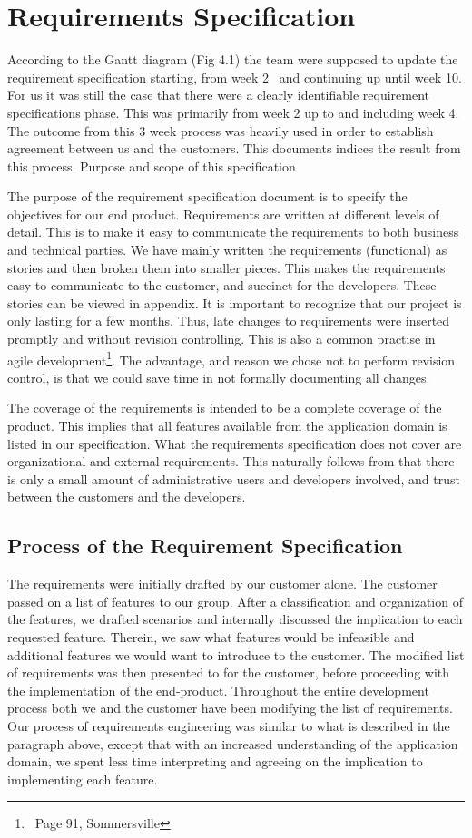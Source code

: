 \section{Requirements Specification}
According to the Gantt diagram (Fig 4.1) the team were supposed to
update the requirement specification starting, from week 2 \ and
continuing up until week 10. For us it was still the case that there
were a clearly identifiable requirement specifications phase. This was
primarily from week 2 up to and including week 4. The outcome from this
3 week process was heavily used in order to establish agreement between
us and the customers. This documents indices the result from this
process. Purpose and scope of this specification

The purpose of the requirement specification document is to specify the
objectives for our end product. Requirements are written at different
levels of detail. This is to make it easy to communicate the
requirements to both business and technical parties. We have mainly
written the requirements (functional) as stories and then broken them
into smaller pieces. This makes the requirements easy to communicate to
the customer, and succinct for the developers. These stories can be
viewed in appendix. It is important to recognize that our project is only lasting for a few
months. Thus, late changes to requirements were inserted promptly and
without revision controlling. This is also a common practise in agile
development\footnote{\ Page 91, Sommersville}. The advantage, and
reason we chose not to perform revision control, is that we could save
time in not formally documenting all changes.

The coverage of the requirements is intended to be a complete coverage
of the product. This implies that all features available from the
application domain is listed in our specification. What the
requirements specification does not cover are organizational and
external requirements. This naturally follows from that there is only a
small amount of administrative users and developers involved, and trust
between the customers and the developers.

\subsection{Process of the Requirement Specification}
The requirements were initially drafted by our customer alone. The
customer passed on a list of features to our group. After a
classification and organization of the features, we drafted scenarios
and internally discussed the implication to each requested feature.
Therein, we saw what features would be infeasible and additional
features we would want to introduce to the customer. The modified list
of requirements was then presented to for the customer, before
proceeding with the implementation of the end-product. 
Throughout the entire development process both we and the customer have
been modifying the list of requirements. Our process of requirements
engineering was similar to what is described in the paragraph above,
except that with an increased understanding of the application domain,
we spent less time interpreting and agreeing on the implication to
implementing each feature.

